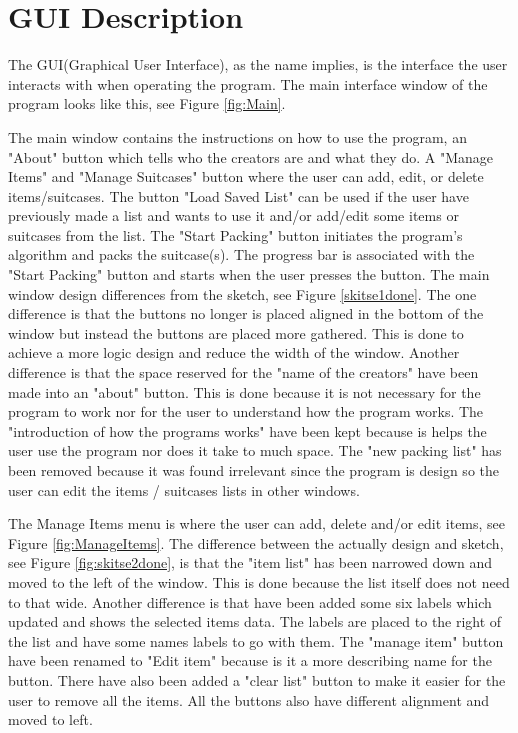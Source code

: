\section{GUI Description}
\label{sec:GUI}
The GUI(Graphical User Interface), as the name implies, is the interface the user interacts with when operating the program.
The main interface window of the program looks like this, see Figure \ref{fig:Main}.


The main window contains the instructions on how to use the program, an "About" button which tells who the creators are and what they do. A "Manage Items" and "Manage Suitcases" button where the user can add, edit, or delete items/suitcases. The button "Load Saved List" can be used if the user have previously made a list and wants to use it and/or add/edit some items or suitcases from the list. The "Start Packing" button initiates the program's algorithm and packs the suitcase(s). The progress bar is associated with the "Start Packing" button and starts when the user presses the button.
The main window design differences from the sketch, see Figure \ref{skitse1done}. The one difference is that the buttons no longer is placed aligned in the bottom of the window but instead the buttons are placed more gathered. This is done to achieve a more logic design and reduce the width of the window. Another difference is that the space reserved for the "name of the creators" have been made into an "about" button. This is done because it is not necessary for the program to work nor for the user to understand how the program works. The "introduction of how the programs works" have been kept because is helps the user use the program nor does it take to much space.
The "new packing list" has been removed because it was found irrelevant since the program is design so the user can edit the items / suitcases lists in other windows.

The Manage Items menu is where the user can add, delete and/or edit items, see Figure \ref{fig:ManageItems}. The difference between the actually design and sketch, see Figure \ref{fig:skitse2done}, is that the "item list" has been narrowed down and moved to the left of the window. This is done because the list itself does not need to that wide. Another difference is that have been added some six labels which updated and shows the selected items data. The labels are placed to the right of the list and have some names labels to go with them. The "manage item" button have been renamed to "Edit item" because is it a more describing name for the button. There have also been added a "clear list" button to make it easier for the user to remove all the items. All the buttons also have different alignment and moved to left.

